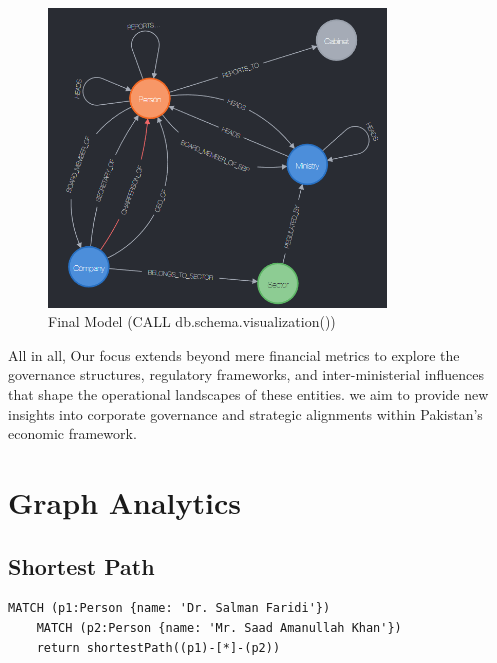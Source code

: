 \documentclass[12pt]{article}
\begin{document}
\begin{figure}
    \centering
    \includegraphics[width=0.8\textwidth]{Final_Model.png} 
    \caption{Final Model (CALL db.schema.visualization())}
\end{figure}

All in all, Our focus extends beyond mere financial metrics to explore the governance structures, regulatory frameworks, and inter-ministerial influences that shape the operational landscapes of these entities.
we aim to provide new insights into corporate governance and strategic alignments within Pakistan’s economic framework.


\section{Graph Analytics}
\subsection{Shortest Path}
\begin{lstlisting}[frame=single]
    MATCH (p1:Person {name: 'Dr. Salman Faridi'})
    MATCH (p2:Person {name: 'Mr. Saad Amanullah Khan'})
    return shortestPath((p1)-[*]-(p2))
\end{lstlisting}
\end{document}
